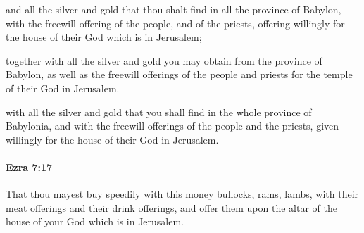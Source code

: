 			\begin{versebox}
					\item[BHS] 
					\item[LXX] 
					\item[ASV] and all the silver and gold that thou shalt find in all the province of Babylon, with the freewill-offering of the people, and of the priests, offering willingly for the house of their God which is in Jerusalem;
					\item[NIV] together with all the silver and gold you may obtain from the province of Babylon, as well as the freewill offerings of the people and priests for the temple of their God in Jerusalem.
					\item[NRSV] with all the silver and gold that you shall find in the whole province of Babylonia, and with the freewill offerings of the people and the priests, given willingly for the house of their God in Jerusalem.
			\end{versebox}

		\paragraph{Ezra 7:17} %
			\label{EZRA-7-17}

			That thou mayest buy speedily with this money bullocks, rams, lambs, with their meat offerings and their drink offerings, and offer them upon the altar of the house of your God which is in Jerusalem.

